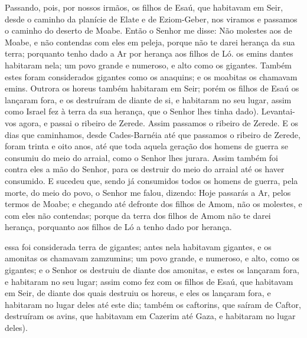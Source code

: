 Passando, pois, por nossos irmãos, os filhos de Esaú, que
habitavam em Seir, desde o caminho da planície de Elate e de
Eziom-Geber, nos viramos e passamos o caminho do deserto de Moabe.
Então o Senhor me disse: Não molestes aos de Moabe, e não
contendas com eles em peleja, porque não te darei herança da sua
terra; porquanto tenho dado a Ar por herança aos filhos de Ló.
os emins dantes habitaram nela; um povo grande e numeroso, e
alto como os gigantes. Também estes foram considerados
gigantes como os anaquins; e os moabitas os chamavam emins.
Outrora os horeus também habitaram em Seir; porém os filhos
de Esaú os lançaram fora, e os destruíram de diante de si, e
habitaram no seu lugar, assim como Israel fez à terra da sua
herança, que o Senhor lhes tinha dado). Levantai-vos agora, e
passai o ribeiro de Zerede. Assim passamos o ribeiro de Zerede.
E os dias que caminhamos, desde Cades-Barnéia até que
passamos o ribeiro de Zerede, foram trinta e oito anos, até que toda
aquela geração dos homens de guerra se consumiu do meio do arraial,
como o Senhor lhes jurara. Assim também foi contra eles a mão
do Senhor, para os destruir do meio do arraial até os haver
consumido. E sucedeu que, sendo já consumidos todos os homens
de guerra, pela morte, do meio do povo, o Senhor me falou,
dizendo: Hoje passarás a Ar, pelos termos de Moabe; e
chegando até defronte dos filhos de Amom, não os molestes, e com
eles não contendas; porque da terra dos filhos de Amom não te darei
herança, porquanto aos filhos de Ló a tenho dado por herança.

essa foi considerada terra de gigantes; antes nela
habitavam gigantes, e os amonitas os chamavam zamzumins; um
povo grande, e numeroso, e alto, como os gigantes; e o Senhor os
destruiu de diante dos amonitas, e estes os lançaram fora, e
habitaram no seu lugar; assim como fez com os filhos de Esaú,
que habitavam em Seir, de diante dos quais destruiu os horeus, e
eles os lançaram fora, e habitaram no lugar deles até este dia;
também os caftorins, que saíram de Caftor, destruíram os
avins, que habitavam em Cazerim até Gaza, e habitaram no lugar
deles).

